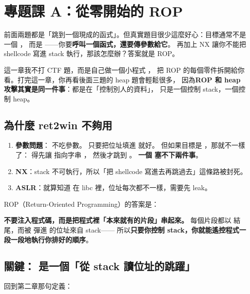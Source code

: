 \section{專題課 A：從零開始的 ROP}
\label{chap:rop}

前面兩題都是「跳到一個現成的函式」。但真實題目很少這麼好心：目標通常不是一個 ，
而是 ——你要\textbf{呼叫一個函式，還要傳參數給它}。
再加上 NX 讓你不能把 shellcode 寫進 stack 執行，那該怎麼辦？答案就是 ROP。

這一章我不打 CTF 題，而是自己做一個小程式 ，
把 ROP 的每個零件拆開給你看。打完這一章，你再看後面三題的 heap 題會輕鬆很多，
因為\textbf{ROP 和 heap 攻擊其實是同一件事}：都是在「控制別人的資料」，
只是一個控制 stack，一個控制 heap。

\subsection{為什麼 ret2win 不夠用}

\begin{enumerate}[leftmargin=1.5em,itemsep=3pt]
  \item \textbf{參數問題}： 不吃參數。
        只要把位址填進  就好。
        但如果目標是 ，那就不一樣了：
        得先讓  指向字串 ，
        然後才跳到 。
        \textbf{一個  塞不下兩件事}。
  \item \textbf{NX}：stack 不可執行，所以「把 shellcode 寫進去再跳過去」這條路被封死。
  \item \textbf{ASLR}：就算知道  在 libc 裡，位址每次都不一樣，需要先 leak。
\end{enumerate}

ROP（Return-Oriented Programming）的答案是：

\begin{keybox}
\textbf{不要注入程式碼，而是把程式裡「本來就有的片段」串起來。}
每個片段都以  結尾，而被  彈進  的位址來自 stack——
所以\textbf{只要你控制 stack，你就能遙控程式一段一段地執行你排好的順序}。
\end{keybox}

\subsection{關鍵： 是一個「從 stack 讀位址的跳躍」}

回到第二章那句定義：

